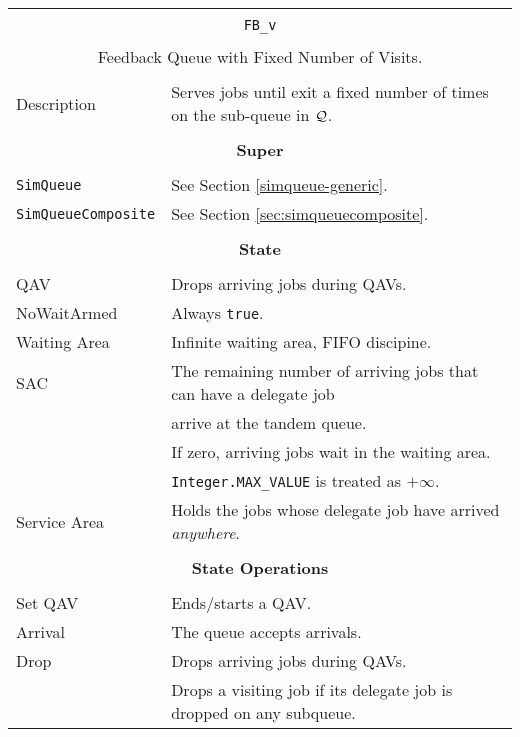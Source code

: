 \begin{tabular}{|l|l|}
	\hline
	\multicolumn{2}{|c|}{} \\
	\multicolumn{2}{|c|}{\lstinline[basicstyle=\large]{FB_v}} \\
	\multicolumn{2}{|c|}{} \\
	\multicolumn{2}{|c|}{Feedback Queue with Fixed Number of Visits.} \\
	\multicolumn{2}{|c|}{} \\
	\hline
	Description & Serves jobs until exit a fixed number of times on the sub-queue in $\cal{Q}$. \\
	\hline
	\multicolumn{2}{|c|}{} \\
	\multicolumn{2}{|c|}{\bf Super} \\
	\multicolumn{2}{|c|}{} \\
	\hline
	\lstinline|SimQueue| & See Section \ref{simqueue-generic}. \\
	\lstinline|SimQueueComposite| & See Section \ref{sec:simqueuecomposite}. \\
	\hline
	\multicolumn{2}{|c|}{} \\
	\multicolumn{2}{|c|}{\bf State} \\
	\multicolumn{2}{|c|}{} \\
	\hline
	QAV & Drops arriving jobs during QAVs. \\
	\hline
	NoWaitArmed & Always \lstinline|true|. \\
	\hline
	Waiting Area & Infinite waiting area, FIFO discipine. \\
	\hline
	SAC & The remaining number of arriving jobs that can have a delegate job \\
	& arrive at the tandem queue. \\
	& If zero, arriving jobs wait in the waiting area. \\
	& \lstinline|Integer.MAX_VALUE| is treated as $+\infty$. \\
	\hline
	Service Area & Holds the jobs whose delegate job have arrived {\em anywhere}. \\
	\hline
	\multicolumn{2}{|c|}{} \\
	\multicolumn{2}{|c|}{\bf State Operations} \\
	\multicolumn{2}{|c|}{} \\
	\hline
	Set QAV & Ends/starts a QAV. \\
	\hline
	Arrival & The queue accepts arrivals. \\
	\hline
	Drop & Drops arriving jobs during QAVs. \\
	& Drops a visiting job if its delegate job is dropped on any subqueue. \\

\end{tabular}
